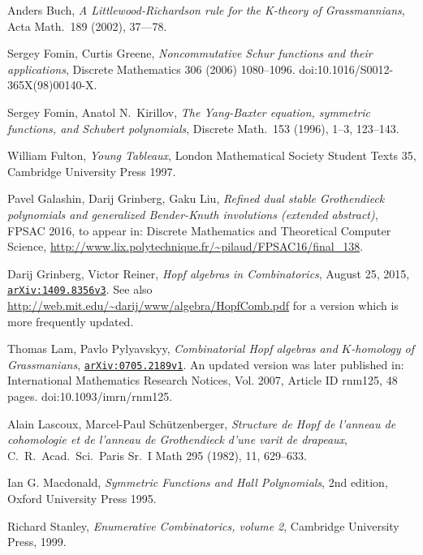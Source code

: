 \documentclass[12pt]{article}
\theoremstyle{plain}
\theoremstyle{definition}
\newcommand{\arxiv}[1]{\href{http://arxiv.org/abs/#1}{\texttt{arXiv:#1}}}
\begin{document}
\begin{thebibliography}{99999999}                                                                                         %


%

Anders Buch, \textit{A Littlewood-Richardson rule for the K-theory of Grassmannians}, Acta Math.\ 189 (2002), 37---78.

Sergey Fomin, Curtis Greene, \textit{Noncommutative
Schur functions and their applications}, Discrete Mathematics 306 (2006) 1080--1096.
doi:10.1016/S0012-365X(98)00140-X.

Sergey Fomin, Anatol N.\ Kirillov, \textit{The Yang-Baxter equation, symmetric functions, and Schubert polynomials}, Discrete Math.\ 153 (1996), 1--3, 123--143.

William Fulton, \textit{Young Tableaux}, London
Mathematical Society Student Texts 35, Cambridge University Press 1997.

Pavel Galashin, Darij Grinberg, Gaku Liu,
\textit{Refined dual stable Grothendieck polynomials
and generalized Bender-Knuth involutions (extended abstract)},
FPSAC 2016, to appear in:
Discrete Mathematics and Theoretical Computer Science,
\url{http://www.lix.polytechnique.fr/~pilaud/FPSAC16/final_138}.

Darij Grinberg, Victor Reiner, \textit{Hopf
algebras in Combinatorics}, August 25, 2015,
\arxiv{1409.8356v3}. \newline See also
\url{http://web.mit.edu/~darij/www/algebra/HopfComb.pdf} for a version which
is more frequently updated.

Thomas Lam, Pavlo Pylyavskyy, \textit{Combinatorial
Hopf algebras and }$K$\textit{-homology of Grassmanians},
\arxiv{0705.2189v1}. An updated version
was later published in: International Mathematics Research Notices, Vol. 2007,
Article ID rnm125, 48 pages. doi:10.1093/imrn/rnm125.

Alain Lascoux, Marcel-Paul Sch\"{u}tzenberger, \textit{Structure de Hopf de l'anneau de cohomologie et de l'anneau de Grothendieck d'une varit de drapeaux}, C.\ R.\ Acad.\ Sci.\ Paris Sr.\ I Math 295 (1982), 11, 629--633.

Ian G. Macdonald, \textit{Symmetric Functions and
Hall Polynomials}, 2nd edition, Oxford University Press 1995.

Richard Stanley, \textit{Enumerative Combinatorics,
volume 2}, Cambridge University Press, 1999.
\end{thebibliography}
\end{document}
